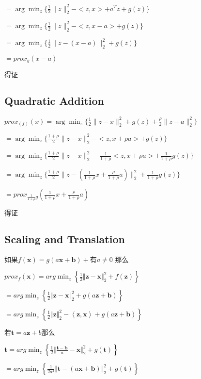 \documentclass[12pt, a4paper, oneside, fontset=windows]{ctexart}
\begin{document}
$= \arg\min_{z}\{ \frac{1}{2} \| z\|^{2}_{2} - <z,x> + a^{T}z + g(z) \}$

$ = \arg\min_{z}\{ \frac{1}{2} \| z\|^{2}_{2} - <z,x-a> + g(z) \}$

$= \arg\min_{z}\{ \frac{1}{2} \| z - (x-a)\|^{2}_{2} + g(z) \}$

$= prox_{g}(x-a)$

得证
\subsection{Quadratic Addition}
$prox_(f)(x) = \arg\min_{z}\{ \frac{1}{2} \| z - x\| ^{2}_{2} +g(z)+\frac{\rho }{2} \| z - a\|_{2}^{2}  \}$

$= \arg\min_{z}\{ \frac{1 + \rho}{2} \| z - x\| ^{2}_{2}- <z,x+\rho a > + g(z)\}$

$= \arg\min_{z}\{ \frac{1 + \rho}{2} \| z - x\| ^{2}_{2} - \frac{1}{1 + \rho}<z,x+\rho  a> + \frac{1}{1+\rho}g(z) \}$

$ = \arg\min_{z}\{ \frac{1 + \rho}{2} \| z - (\frac{1}{1+\rho}x + \frac{\rho}{1 + \rho}a)\| ^{2}_{2}+\frac{1}{1 + \rho}g(z)\}$

$ = prox_{\frac{1}{1+\rho}g}(\frac{1}{1+\rho}x + \frac{\rho}{1 + \rho}a)$

得证

\subsection{Scaling and Translation}
如果$f(\mathbf  x )=g (a\mathbf  x +\mathbf b)+$有$ a\neq 0$ 那么

$prox_{f}\left ( \mathbf x \right )=arg\min_{z}\left \{ \frac{1}{2}\Vert \mathbf z - \mathbf x \Vert _2^{2}+f \left (\mathbf z \right )\right \}$

$=arg\min_{z}\left \{ \frac{1}{2}\Vert \mathbf z - \mathbf x \Vert _2^{2}+g\left (a\mathbf z+\mathbf b \right )\right \}$

$=arg\min_{z}\left \{ \frac{1}{2}\Vert \mathbf z \Vert _2^{2}-\left \langle \mathbf z ,\mathbf x \right \rangle+g\left (a\mathbf z+\mathbf b \right )\right \}$

若$\mathbf t=a\mathbf z+b$那么

$\mathbf t=arg\min_{z}\left \{ \frac{1}{2}\Vert \frac{\mathbf t-\mathbf b}{a} - \mathbf x \Vert _2^{2}+g \left (\mathbf t \right )\right \}$

$=arg\min_{z}\left \{ \frac{1}{2a^{2}}\Vert \mathbf t - \left ( a\mathbf x +\mathbf b \right )\Vert _2^{2}+g \left (\mathbf t \right )\right \}$
\end{document}
